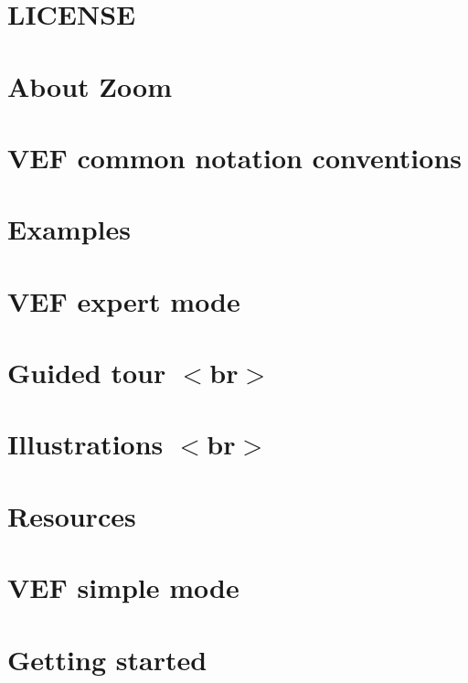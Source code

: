 \documentclass[twoside]{book}
\newcommand{\+}{\discretionary{\mbox{\scriptsize$\hookleftarrow$}}{}{}}
\begin{document}
\chapter{LICENSE}
\label{md_VEF_manual_assets_jquery_zoom_LICENSE}

\chapter{About Zoom}
\label{md_VEF_manual_assets_jquery_zoom_readme}

\chapter{VEF common notation conventions}
\label{page_conventions}

\chapter{Examples}
\label{examples}

\chapter{VEF expert mode}
\label{page_expert_mode}

\chapter{Guided tour \texorpdfstring{$<$}{<}br\texorpdfstring{$>$}{>}}
\label{guided_tour}

\chapter{Illustrations \texorpdfstring{$<$}{<}br\texorpdfstring{$>$}{>}}
\label{page_illustrations}

\chapter{Resources}
\label{page_resources}

\chapter{VEF simple mode}
\label{page_simple_mode}

\chapter{Getting started}
\label{page_gettingstarted}

\end{document}
